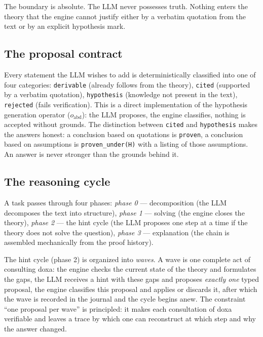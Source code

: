 \documentclass[12pt,a4paper]{article}
\begin{document}
The boundary is absolute. The LLM never possesses truth. Nothing enters the
theory that the engine cannot justify either by a verbatim quotation from the
text or by an explicit hypothesis mark.

\subsection{The proposal contract}
\label{sec:contract}

Every statement the LLM wishes to add is deterministically classified into one
of four categories: \texttt{derivable} (already follows from the theory),
\texttt{cited} (supported by a verbatim quotation), \texttt{hypothesis}
(knowledge not present in the text), \texttt{rejected} (fails verification).
This is a direct implementation of the hypothesis generation operator
($o_{\text{abd}}$): the LLM proposes, the engine classifies, nothing is
accepted without grounds. The distinction between \texttt{cited} and
\texttt{hypothesis} makes the answers honest: a conclusion based on quotations
is \texttt{proven}, a conclusion based on assumptions is
\texttt{proven\_under(H)} with a listing of those assumptions. An answer is
never stronger than the grounds behind it.

\subsection{The reasoning cycle}
\label{sec:cycle}

A task passes through four phases: \emph{phase 0} --- decomposition (the LLM
decomposes the text into structure), \emph{phase 1} --- solving (the engine
closes the theory), \emph{phase 2} --- the hint cycle (the LLM proposes one
step at a time if the theory does not solve the question), \emph{phase 3} ---
explanation (the chain is assembled mechanically from the proof history).

The hint cycle (phase 2) is organized into \emph{waves}. A wave is one
complete act of consulting doxa: the engine checks the current state of the
theory and formulates the gaps, the LLM receives a hint with these gaps and
proposes \emph{exactly one} typed proposal, the engine classifies this
proposal and applies or discards it, after which the wave is recorded in the
journal and the cycle begins anew. The constraint ``one proposal per wave'' is
principled: it makes each consultation of doxa verifiable and leaves a trace
by which one can reconstruct at which step and why the answer changed.
\end{document}
